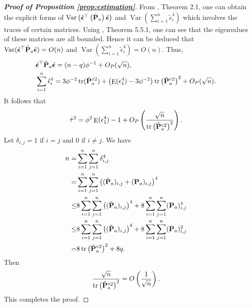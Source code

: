 \documentclass[smallextended]{svjour3}       %
\DeclareMathOperator{\mytr}{tr}
\DeclareMathOperator{\myE}{E}
\DeclareMathOperator{\myVar}{Var}
\begin{document}
\begin{proof}[\textbf{Proof of Proposition \ref{prop:estimation}}]
    From \cite{Bai2017}, Theorem 2.1, one can obtain the explicit forms of $\myVar \left( \tilde \bepsilon^\top \left( \tilde \BP_a \right) \tilde \bepsilon  \right)$ and $\myVar \left( \sum_{i=1}^n \tilde \epsilon_i^4 \right)$ which involves the traces of certain matrices.
    Using \cite{book:1244195}, Theorem 5.5.1, one can see that the eigenvalues of these matrices are all bounded.
    Hence it can be deduced that $\myVar ( \tilde \bepsilon^\top  \tilde \BP_a \tilde \bepsilon  )=O(n)$ and $\myVar \left( \sum_{i=1}^n \tilde \epsilon_i^4 \right)=O(n)$.
    Thus,
    \begin{align*}
        & \tilde \bepsilon^\top  \tilde \BP_a  \tilde \bepsilon
        = (n-q) \phi^{-1}+O_P(\sqrt n),
        \\
        & \sum_{i=1}^n \tilde \epsilon_i^4 
        =
        3\phi^{-2} \mytr (\tilde \BP_a^{\circ 2}) 
        +\left( \myE (\epsilon_1^4)-3 \phi^{-2}\right)
        \mytr \left( \tilde \BP_a^{\circ 2}  \right)^2 + O_P(\sqrt n).
    \end{align*}
    It follows that
    \begin{equation*}
        \hat \tau ^2 = \phi^{2}\myE (\epsilon_1^4)-1
        +O_P\left( \frac{\sqrt n}{\mytr \left( \tilde \BP_a ^{\circ 2} \right)^2} \right).
    \end{equation*}
    Let $\delta_{i,j}=1$ if $i=j$ and $0$ if $i\neq j$.
    We have
    \begin{equation*}
        \begin{split}
        n=&
        \sum_{i=1}^n \sum_{j=1}^n \delta_{i,j}^4 
        \\
        =&
        \sum_{i=1}^n \sum_{j=1}^n \left( (\tilde \BP_{a})_{i,j}+(\BP_{a})_{i,j} \right)^4 
        \\
        \leq&
    8\sum_{i=1}^n \sum_{j=1}^n \left( (\tilde \BP_{a})_{i,j}\right)^4+
    8\sum_{i=1}^n \sum_{j=1}^n(\BP_{a})_{i,j}^4
        \\
        \leq&
    8\sum_{i=1}^n \sum_{j=1}^n \left( (\tilde \BP_{a})_{i,j}\right)^4+
    8\sum_{i=1}^n \sum_{j=1}^n(\BP_{a})_{i,j}^2
    \\
    =&
        8\mytr \left(   \tilde \BP_a^{\circ 2} \right)^2
        +8q.
        \end{split}
    \end{equation*}
    Then
    \begin{equation*}
        \frac{\sqrt n}{\mytr \left( \tilde \BP_a^{\circ 2} \right)^2} 
        =
        O\left( \frac{1}{\sqrt n} \right).
    \end{equation*}
    This completes the proof.
\end{proof}
\end{document}
